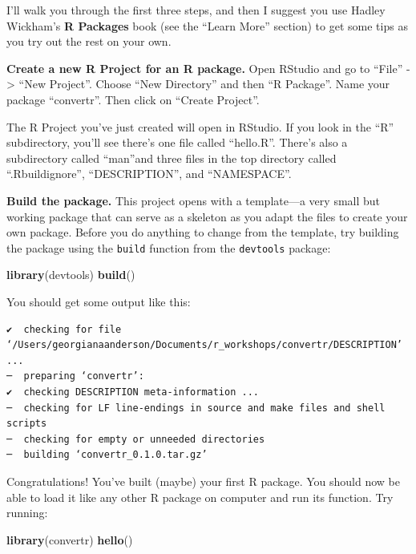 \documentclass[]{tufte-book}
\newenvironment{Shaded}{}{}
\newcommand{\KeywordTok}[1]{\textcolor[rgb]{0.00,0.44,0.13}{\textbf{#1}}}
\newcommand{\NormalTok}[1]{#1}
\begin{document}
I'll walk you through the first three steps, and then I suggest you use
Hadley Wickham's \textbf{R Packages} book (see the ``Learn More'' section) to
get some tips as you try out the rest on your own.

\textbf{Create a new R Project for an R package.} Open RStudio and go to ``File'' -\textgreater{}
``New Project''. Choose ``New Directory'' and then ``R Package''. Name your package
``convertr''. Then click on ``Create Project''.

The R Project you've just created will open in RStudio. If you look in the ``R''
subdirectory, you'll see there's one file called ``hello.R''. There's also a
subdirectory called ``man''and three files in the top directory called
``.Rbuildignore'', ``DESCRIPTION'', and ``NAMESPACE''.

\textbf{Build the package.} This project opens with a template---a very small but working package that can
serve as a skeleton as you adapt the files to create your own package. Before you
do anything to change from the template, try building the package using the
\texttt{build} function from the \texttt{devtools} package:

\begin{Shaded}
\begin{Highlighting}[]
\KeywordTok{library}\NormalTok{(devtools)}
\KeywordTok{build}\NormalTok{()}
\end{Highlighting}
\end{Shaded}

You should get some output like this:

\begin{verbatim}
✔  checking for file ‘/Users/georgianaanderson/Documents/r_workshops/convertr/DESCRIPTION’ ...
─  preparing ‘convertr’:
✔  checking DESCRIPTION meta-information ...
─  checking for LF line-endings in source and make files and shell scripts
─  checking for empty or unneeded directories
─  building ‘convertr_0.1.0.tar.gz’
\end{verbatim}

Congratulations! You've built (maybe) your first R package. You should now be able to
load it like any other R package on computer and run its function. Try running:

\begin{Shaded}
\begin{Highlighting}[]
\KeywordTok{library}\NormalTok{(convertr)}
\KeywordTok{hello}\NormalTok{()}
\end{Highlighting}
\end{Shaded}
\end{document}
